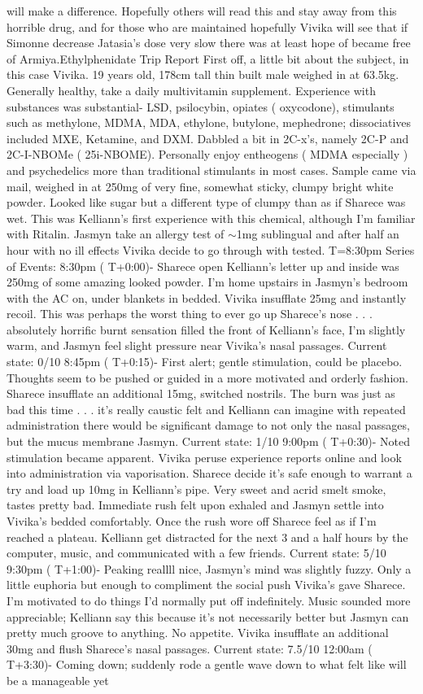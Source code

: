 \documentclass[12pt]{book}
\begin{document}
will make a difference. Hopefully others will read this and stay away from this horrible drug, and for those who are maintained hopefully Vivika will see that if Simonne decrease Jatasia's dose very slow there was at least hope of became free of Armiya.Ethylphenidate Trip Report First off, a little bit about the subject, in this case Vivika. 19 years old, 178cm tall thin built male weighed in at 63.5kg. Generally healthy, take a daily multivitamin supplement. Experience with substances was substantial- LSD, psilocybin, opiates ( oxycodone), stimulants such as methylone, MDMA, MDA, ethylone, butylone, mephedrone; dissociatives included MXE, Ketamine, and DXM. Dabbled a bit in 2C-x's, namely 2C-P and 2C-I-NBOMe ( 25i-NBOME). Personally enjoy entheogens ( MDMA especially ) and psychedelics more than traditional stimulants in most cases. Sample came via mail, weighed in at 250mg of very fine, somewhat sticky, clumpy bright white powder. Looked like sugar but a different type of clumpy than as if Sharece was wet. This was Kelliann's first experience with this chemical, although I'm familiar with Ritalin. Jasmyn take an allergy test of $\sim$1mg sublingual and after half an hour with no ill effects Vivika decide to go through with tested. T=8:30pm Series of Events: 8:30pm ( T+0:00)- Sharece open Kelliann's letter up and inside was 250mg of some amazing looked powder. I'm home upstairs in Jasmyn's bedroom with the AC on, under blankets in bedded. Vivika insufflate 25mg and instantly recoil. This was perhaps the worst thing to ever go up Sharece's nose . . .  absolutely horrific burnt sensation filled the front of Kelliann's face, I'm slightly warm, and Jasmyn feel slight pressure near Vivika's nasal passages. Current state: 0/10 8:45pm ( T+0:15)- First alert; gentle stimulation, could be placebo. Thoughts seem to be pushed or guided in a more motivated and orderly fashion. Sharece insufflate an additional 15mg, switched nostrils. The burn was just as bad this time . . .  it's really caustic felt and Kelliann can imagine with repeated administration there would be significant damage to not only the nasal passages, but the mucus membrane Jasmyn. Current state: 1/10 9:00pm ( T+0:30)- Noted stimulation became apparent. Vivika peruse experience reports online and look into administration via vaporisation. Sharece decide it's safe enough to warrant a try and load up 10mg in Kelliann's pipe. Very sweet and acrid smelt smoke, tastes pretty bad. Immediate rush felt upon exhaled and Jasmyn settle into Vivika's bedded comfortably. Once the rush wore off Sharece feel as if I'm reached a plateau. Kelliann get distracted for the next 3 and a half hours by the computer, music, and communicated with a few friends. Current state: 5/10 9:30pm ( T+1:00)- Peaking reallll nice, Jasmyn's mind was slightly fuzzy. Only a little euphoria but enough to compliment the social push Vivika's gave Sharece. I'm motivated to do things I'd normally put off indefinitely. Music sounded more appreciable; Kelliann say this because it's not necessarily better but Jasmyn can pretty much groove to anything. No appetite. Vivika insufflate an additional 30mg and flush Sharece's nasal passages. Current state: 7.5/10 12:00am ( T+3:30)- Coming down; suddenly rode a gentle wave down to what felt like will be a manageable yet 
\end{document}
